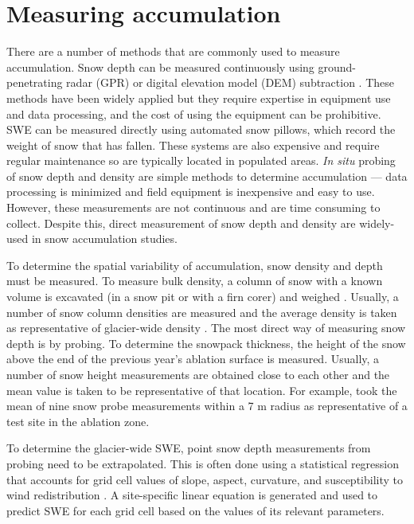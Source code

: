 \documentclass[12pt]{article}
\begin{document}
\section{Measuring accumulation}
There are a number of methods that are commonly used to measure accumulation. Snow depth can be measured continuously using ground-penetrating radar (GPR) \citep[e.g.][]{Machguth2006} or digital elevation model (DEM) subtraction \citep[e.g.][]{Deems2006}. These methods have been widely applied but they require expertise in equipment use and data processing, and the cost of using the equipment can be prohibitive. SWE can be measured directly using automated snow pillows, which record the weight of snow that has fallen. These systems are also expensive and require regular maintenance so are typically located in populated areas. \textit{In situ} probing of snow depth and density are simple methods to determine accumulation --- data processing is minimized and field equipment is inexpensive and easy to use. However, these measurements are not continuous and are time consuming to collect. Despite this, direct measurement of snow depth and density are widely-used in snow accumulation studies.

To determine the spatial variability of accumulation, snow density and depth must be measured. To measure bulk density, a column of snow with a known volume is excavated (in a snow pit or with a firn corer) and weighed \citep{Sold2013, Sold2014}. Usually, a number of snow column densities are measured and the average density is taken as representative of glacier-wide density \citep[e.g.][]{Machguth2006, Grunewald2010, McGrath2015}. The most direct way of measuring snow depth is by probing. To determine the snowpack thickness, the height of the snow above the end of the previous year's ablation surface is measured. Usually, a number of snow height measurements are obtained close to each other and the mean value is taken to be representative of that location. For example, \cite{Machguth2006} took the mean of nine snow probe measurements within a 7 m radius as representative of a test site in the ablation zone.  

To determine the glacier-wide SWE, point snow depth measurements from probing need to be extrapolated. This is often done using a statistical regression that accounts for grid cell values of slope, aspect, curvature, and susceptibility to wind redistribution \citep[e.g.][]{Wheler2014,McGrath2015}. A site-specific linear equation is generated and used to predict SWE for each grid cell based on the values of its relevant parameters. 
\end{document}
